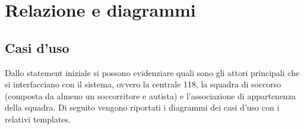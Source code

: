 \documentclass{article}
\begin{document}
    \section{Relazione e diagrammi}
    \subsection{Casi d'uso}
    Dallo statement iniziale si possono evidenziare quali sono gli attori principali che si interfacciano con il sistema, ovvero la centrale 118, la squadra di soccorso (composta da almeno un soccorritore e autista) e l'associazione di appartenenza della squadra.
    Di seguito vengono riportati i diagrammi dei casi d'uso con i relativi templates.
\end{document}

